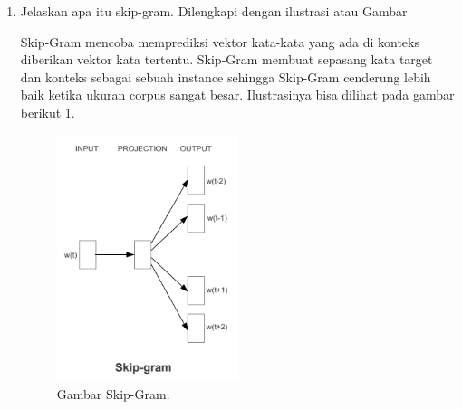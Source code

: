 \begin{enumerate}
\item Jelaskan apa itu skip-gram. Dilengkapi dengan ilustrasi atau Gambar
\par Skip-Gram mencoba memprediksi vektor kata-kata yang ada di konteks diberikan vektor kata tertentu. Skip-Gram membuat sepasang kata target dan konteks sebagai sebuah instance sehingga Skip-Gram cenderung lebih baik ketika ukuran corpus sangat besar.  Ilustrasinya bisa dilihat pada gambar berikut  \ref{no6}.
\begin{figure}[ht]
\centerline{\includegraphics[width=0.5\textwidth]{figures/AFS/no6.png}}
\caption{Gambar Skip-Gram.}
\label{no6}
\end{figure}
\end{enumerate}




